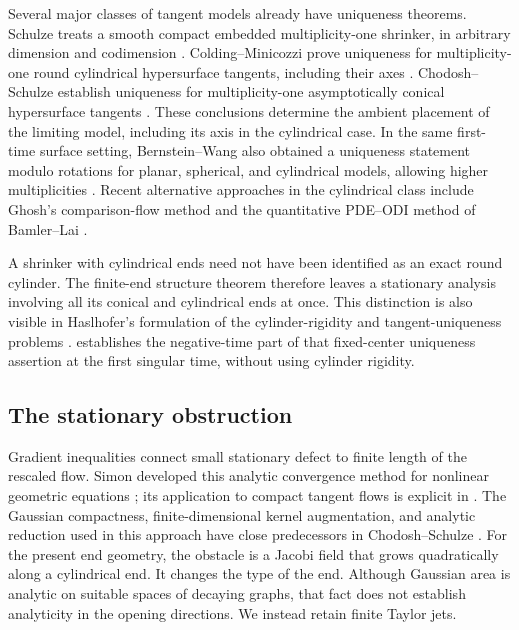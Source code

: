 Several major classes of tangent models already have uniqueness
theorems. Schulze treats a smooth compact embedded multiplicity-one
shrinker, in arbitrary dimension and codimension
\cite[Corollary~1.2]{Schulze2014}. Colding--Minicozzi prove uniqueness
for multiplicity-one round cylindrical hypersurface tangents, including
their axes \cite[Theorem~0.2]{CM2015}. Chodosh--Schulze establish
uniqueness for multiplicity-one asymptotically conical hypersurface
tangents \cite[Theorem~1.1]{CS2021}. These conclusions determine the ambient
placement of the limiting model, including its axis in the cylindrical case.
In the same first-time surface setting, Bernstein--Wang also
obtained a uniqueness statement modulo rotations for planar,
spherical, and cylindrical models, allowing higher multiplicities
\cite[Theorem~1.1]{BW2015}.  Recent alternative approaches in the
cylindrical class include Ghosh's comparison-flow method
\cite[Theorem~1.1 and Sections~4 and~6]{Ghosh2026} and the quantitative
PDE--ODI method of Bamler--Lai
\cite[Corollary~5.97]{BamlerLai2026}.

A shrinker with cylindrical ends need not have been identified as an
exact round cylinder. The finite-end structure theorem therefore
leaves a stationary analysis involving all its conical and cylindrical
ends at once. This distinction is also visible in Haslhofer's
formulation of the cylinder-rigidity and tangent-uniqueness problems
\cite[Section~5.1, Problem~5.1 and Conjecture~5.2]{Haslhofer2025}.
 establishes the negative-time part of that fixed-center
uniqueness assertion at the first singular time, without using cylinder rigidity.

\subsection{The stationary obstruction}

Gradient inequalities connect small stationary defect to finite length
of the rescaled flow.  Simon developed this analytic convergence
method for nonlinear geometric equations \cite{Simon1983}; its
application to compact tangent flows is explicit in
\cite[Section~3]{Schulze2014}. The Gaussian compactness, finite-dimensional
kernel augmentation, and analytic reduction used in this approach have
close predecessors in Chodosh--Schulze
\cite[Sections~3.4 and~4]{CS2021}. For the present end geometry, the
obstacle is a Jacobi field that grows quadratically along a cylindrical
end. It changes the type of the end. Although Gaussian area is analytic
on suitable spaces of decaying graphs, that fact does not establish
analyticity in the opening directions. We instead retain finite Taylor jets.

